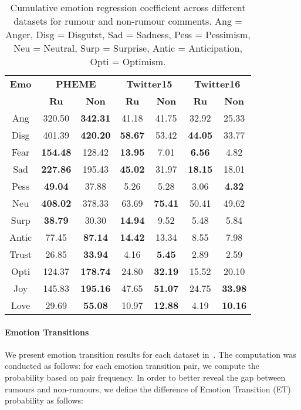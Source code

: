 \begin{table}[h]
\centering
\small
\begin{tabular}{c cc cc cc}
\toprule
\textbf{Emo} & \multicolumn{2}{c}{\textbf{PHEME}} & \multicolumn{2}{c}{\textbf{Twitter15}} & \multicolumn{2}{c}{\textbf{Twitter16}} \\ 
 & \textbf{Ru} & \textbf{Non} &  \textbf{Ru} & \textbf{Non} &  \textbf{Ru} & \textbf{Non} \\ 
\midrule
Ang          & 320.50 & \textbf{342.31} & 41.18 & 41.75 & 32.92 & 25.33  \\
Disg        & 401.39 & \textbf{420.20} & \textbf{58.67} & 53.42  & \textbf{44.05} & 33.77  \\
Fear           & \textbf{154.48} & 128.42  & \textbf{13.95} & 7.01 & \textbf{6.56} & 4.82  \\
Sad        & \textbf{227.86} & 195.43 & \textbf{45.02} & 31.97  & \textbf{18.15} & 18.01  \\
Pess     & \textbf{49.04} & 37.88 & 5.26 & 5.28 & 3.06 & \textbf{4.32}  \\
Neu        & \textbf{408.02} & 378.33 & 63.69 & \textbf{75.41}  & 50.41 & 49.62 \\
Surp       & \textbf{38.79} & 30.30 & \textbf{14.94} & 9.52 & 5.48 & 5.84 \\
Antic   & 77.45 & \textbf{87.14} & \textbf{14.42} & 13.34 & 8.55 & 7.98 \\
Trust          & 26.85 & \textbf{33.94} &  4.16 & \textbf{5.45}  & 2.89 & 2.59 \\
Opti       & 124.37 & \textbf{178.74} & 24.80 & \textbf{32.19} & 15.52 & 20.10 \\
Joy            & 145.83 & \textbf{195.16} & 47.65 & \textbf{51.07}  & 24.75 & \textbf{33.98}  \\
Love           & 29.69 & \textbf{55.08}  & 10.97 & \textbf{12.88}  & 4.19 & \textbf{10.16}  \\
\bottomrule
\end{tabular}
\caption{Cumulative emotion regression coefficient across different datasets for rumour and non-rumour comments. Ang = Anger, Disg = Disgutst, Sad = Sadness, Pess = Pessimism, Neu =  Neutral, Surp = Surprise, Antic = Anticipation, Opti = Optimism. }
\label{tab:emotion_slope}
\end{table}


\paragraph{Emotion Transitions}
We present emotion transition results for each dataset in~. The computation was conducted as follows: for each emotion transition pair, we compute the probability based on pair frequency. In order to better reveal the gap between rumours and non-rumours, we define the difference of Emotion Transition (ET) probability as follows: 

